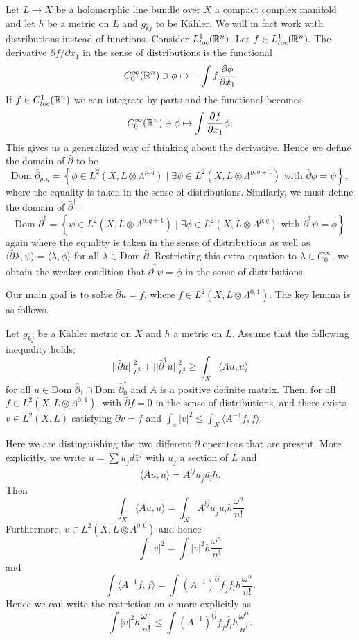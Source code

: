 \documentclass{../mathnotes}
\begin{document}
Let $L\to X$ be a holomorphic line bundle over $X$ a compact complex manifold and let $h$ be a metric on $L$
and $g_{\bar kj}$ to be K\"ahler. We will in fact work with distributions instead of functions. Consider
$L^1_{loc}(\mathbb{R}^n)$. Let $f\in L^1_{loc}(\mathbb{R}^n).$ The derivative $\partial f/\partial x_1$ in the sense of
distributions is the functional
\begin{align*}
    C^\infty_0(\mathbb{R}^n)\ni\phi\mapsto -\int f\frac{\partial\phi}{\partial x_1}
\end{align*}
If $f\in C^1_{loc}(\mathbb{R}^n)$ we can integrate by parts and the functional becomes
\[C^\infty_0(\mathbb{R}^n)\ni\phi\mapsto \int\frac{\partial f}{\partial x_1}\phi.\]
This gives us a generalized way of thinking about the derivative. Hence we define the domain of $\bar\partial$
to be \[\text{Dom }\bar\partial_{p,q}=\left\{\phi\in L^2(X,L\otimes\Lambda^{p,q})\mid\exists\psi\in L^2(X,L\otimes\Lambda^{p,q+1})\text{ with }\bar\partial\phi=\psi\right\},\]
where the equality is taken in the sense of distributions. Similarly, we must define the domain of $\bar\partial^\dagger$:
\[\text{Dom }\bar\partial^\dagger=\left\{ \psi\in L^2(X,L\otimes\Lambda^{p,q+1})\mid \exists \phi\in L^2(X,L\otimes\Lambda^{p,q})\text{ with }\bar\partial^\dagger\psi=\phi \right\}\]
again where the equality is taken in the sense of distributions as well as $\langle\bar\partial\lambda,\psi\rangle=\langle\lambda,\phi\rangle$ for all $\lambda\in\text{Dom }\bar\partial$.
Restricting this extra equation to $\lambda\in C^\infty_0$, we obtain the weaker condition that $\bar\partial^\dagger\psi=\phi$ in the sense of distributions.

Our main goal is to solve $\bar\partial u=f$, where $f\in L^2(X,L\otimes\Lambda^{0,1})$.
The key lemma is as follows.
\begin{lem}
 Let $g_{\bar kj}$ be a K\"ahler metric on $X$ and $h$ a metric on $L$. Assume that the following
inequality holds:
\[||\bar\partial u||^2_{L^2}+||\bar\partial^\dagger u||^2_{L^2}\geq\int_X \langle Au,u\rangle\]
for all $u\in\text{Dom }\bar\partial_1\cap\text{Dom }\bar\partial^\dagger_0$ and $A$ is a positive definite matrix.
Then, for all $f\in L^2(X,L\otimes \Lambda^{0,1})$, with $\bar\partial f=0$ in the sense of distributions, and there exists $v\in L^2(X,L)$
satisfying $\bar\partial v=f$ and $\int_x|v|^2\leq\int_X\langle A^{-1}f,f\rangle$. 
\end{lem}
Here we are distinguishing the two different $\bar\partial$ operators
that are present. More explicitly, we write $u=\sum u_{\bar j}d\bar z^j$ with $u_{\bar j}$ a section of $L$ and
\[\langle Au,u\rangle=A^{l\bar j}u_{\bar j}\overline{u_{\bar l}}h.\]
Then
\[\int_X \langle Au,u\rangle=\int_X A^{l\bar j}u_{\bar j}\overline{u_{\bar l}}h\frac{\omega^n}{n!}\]
Furthermore, $v\in L^2(X,L\otimes \Lambda^{0,0})$ and hence \[\int|v|^2=\int |v|^2h\frac{\omega^n}{n^!}\]
and
\[\int\langle A^{-1}f,f\rangle=\int (A^{-1})^{l\bar j}f_{\bar j}\overline{f_{\bar l}}h\frac{\omega^n}{n!}.\]
Hence we can write the restriction on $v$ more explicitly as
\[\int |v|^2h\frac{\omega^n}{n!}\leq \int (A^{-1})^{l\bar j}f_{\bar j}\overline{f_{\bar l}}h\frac{\omega^n}{n!}.\]
\end{document}

